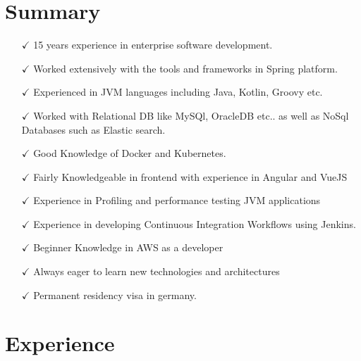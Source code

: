 \documentclass[letterpaper]{twentysecondcv} %
\begin{document}
\section{Summary}
\begin{itemize}[leftmargin=*]
	\item[$\checkmark$] 15 years experience in enterprise software development.
	\item[$\checkmark$] Worked extensively with the tools and frameworks in Spring platform.
	\item[$\checkmark$] Experienced in JVM languages including Java, Kotlin, Groovy etc.
	\item[$\checkmark$] Worked with Relational DB like MySQl, OracleDB etc.. as well as NoSql Databases such as Elastic search.
	\item[$\checkmark$] Good Knowledge of Docker and Kubernetes.
	\item[$\checkmark$] Fairly Knowledgeable in frontend with experience in Angular and VueJS
	\item[$\checkmark$] Experience in Profiling and performance testing JVM applications
	\item[$\checkmark$] Experience in developing Continuous Integration Workflows using Jenkins.
	\item[$\checkmark$] Beginner Knowledge in AWS as a developer
	\item[$\checkmark$] Always eager to learn new technologies and architectures
	\item[$\checkmark$] Permanent residency visa in germany.
\end{itemize}

\vspace{10 pt}

\section{Experience} 
 
\end{document}
